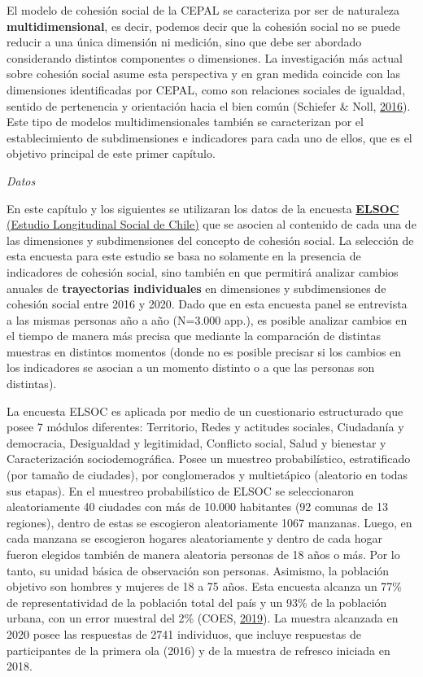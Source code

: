 \documentclass[
  12pt,
]{book}
\begin{document}
El modelo de cohesión social de la CEPAL se caracteriza por ser de naturaleza \textbf{multidimensional}, es decir, podemos decir que la cohesión social no se puede reducir a una única dimensión ni medición, sino que debe ser abordado considerando distintos componentes o dimensiones. La investigación más actual sobre cohesión social asume esta perspectiva y en gran medida coincide con las dimensiones identificadas por CEPAL, como son relaciones sociales de igualdad, sentido de pertenencia y orientación hacia el bien común (Schiefer \& Noll, \protect\hyperlink{ref-schiefer_essentials_2016}{2016}). Este tipo de modelos multidimensionales también se caracterizan por el establecimiento de subdimensiones e indicadores para cada uno de ellos, que es el objetivo principal de este primer capítulo.

\emph{Datos}

En este capítulo y los siguientes se utilizaran los datos de la encuesta \href{https://coes.cl/encuesta-panel/}{\textbf{ELSOC} (Estudio Longitudinal Social de Chile)} que se asocien al contenido de cada una de las dimensiones y subdimensiones del concepto de cohesión social. La selección de esta encuesta para este estudio se basa no solamente en la presencia de indicadores de cohesión social, sino también en que permitirá analizar cambios anuales de \textbf{trayectorias individuales} en dimensiones y subdimensiones de cohesión social entre 2016 y 2020. Dado que en esta encuesta panel se entrevista a las mismas personas año a año (N=3.000 app.), es posible analizar cambios en el tiempo de manera más precisa que mediante la comparación de distintas muestras en distintos momentos (donde no es posible precisar si los cambios en los indicadores se asocian a un momento distinto o a que las personas son distintas).

La encuesta ELSOC es aplicada por medio de un cuestionario estructurado que posee 7 módulos diferentes: Territorio, Redes y actitudes sociales, Ciudadanía y democracia, Desigualdad y legitimidad, Conflicto social, Salud y bienestar y Caracterización sociodemográfica. Posee un muestreo probabilístico, estratificado (por tamaño de ciudades), por conglomerados y multietápico (aleatorio en todas sus etapas). En el muestreo probabilístico de ELSOC se seleccionaron aleatoriamente 40 ciudades con más de 10.000 habitantes (92 comunas de 13 regiones), dentro de estas se escogieron aleatoriamente 1067 manzanas. Luego, en cada manzana se escogieron hogares aleatoriamente y dentro de cada hogar fueron elegidos también de manera aleatoria personas de 18 años o más. Por lo tanto, su unidad básica de observación son personas. Asimismo, la población objetivo son hombres y mujeres de 18 a 75 años. Esta encuesta alcanza un 77\% de representatividad de la población total del país y un 93\% de la población urbana, con un error muestral del 2\% (COES, \protect\hyperlink{ref-coes_radiografia_2019}{2019}). La muestra alcanzada en 2020 posee las respuestas de 2741 individuos, que incluye respuestas de participantes de la primera ola (2016) y de la muestra de refresco iniciada en 2018.
\end{document}
